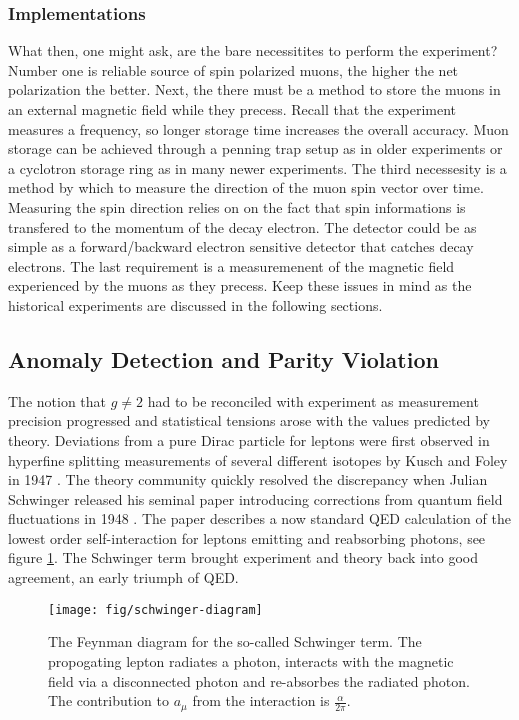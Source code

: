 \subsubsection{Implementations}

What then, one might ask, are the bare necessitites to perform the \gmtwo experiment?  Number one is reliable source of spin polarized muons, the higher the net polarization the better.  Next, the there must be a method to store the muons in an external magnetic field while they precess.  Recall that the experiment measures a frequency, so longer storage time increases the overall accuracy. Muon storage can be achieved through a penning trap setup as in older experiments or a cyclotron storage ring as in many newer experiments.  The third necessesity is a method by which to measure the direction of the muon spin vector over time.  Measuring the spin direction relies on on the fact that spin informations is transfered to the momentum of the decay electron.  The detector could be as simple as a forward/backward electron sensitive detector that catches decay electrons.  The last requirement is a measuremenent of the magnetic field experienced by the muons as they precess.  Keep these issues in mind as the historical experiments are discussed in the following sections.


\subsection{Anomaly Detection and Parity Violation}

The notion that $g \ne 2$ had to be reconciled with experiment as measurement precision progressed and statistical tensions arose with the values predicted by theory.  Deviations from a pure Dirac particle for leptons were first observed in hyperfine splitting measurements of several different isotopes by Kusch and Foley in 1947 \cite{kusch-foley}.  The theory community quickly resolved the discrepancy when Julian Schwinger released his seminal paper introducing corrections from quantum field fluctuations in 1948 \cite{schwinger}.  The paper describes a now standard QED calculation of the lowest order self-interaction for leptons emitting and reabsorbing photons, see figure \ref{fig:schwinger-diagram}.  The Schwinger term brought experiment and theory back into good agreement, an early triumph of QED.

\begin{figure}
\label{fig:schwinger-diagram}
\centering
\texttt{[image: fig/schwinger-diagram]}
\caption{The Feynman diagram for the so-called Schwinger term. The propogating lepton radiates a photon, interacts with the magnetic field via a disconnected photon and re-absorbes the radiated photon.  The contribution to $a_\mu$ from the interaction is $\frac{\alpha}{2\pi}$.}
\end{figure}

